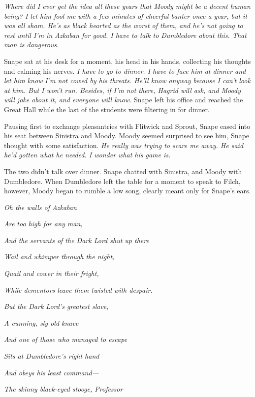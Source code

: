 \emph{Where did I ever get the idea all these years that Moody might be a decent human being? I let him fool me with a few minutes of cheerful banter once a year, but it was all sham. He's as black hearted as the worst of them, and he's not going to rest until I'm in Azkaban for good. I have to talk to Dumbledore about this. That man is dangerous.}

Snape sat at his desk for a moment, his head in his hands, collecting his thoughts and calming his nerves. \emph{I have to go to dinner. I have to face him at dinner and let him know I'm not cowed by his threats. He'll know anyway because I can't look at him. But I won't run. Besides, if I'm not there, Hagrid will ask, and Moody will joke about it, and everyone will know.} Snape left his office and reached the Great Hall while the last of the students were filtering in for dinner.

Pausing first to exchange pleasantries with Flitwick and Sprout, Snape eased into his seat between Sinistra and Moody. Moody seemed surprised to see him, Snape thought with some satisfaction. \emph{He really was trying to scare me away. He said he'd gotten what he needed. I wonder what his game is.}

The two didn't talk over dinner. Snape chatted with Sinistra, and Moody with Dumbledore. When Dumbledore left the table for a moment to speak to Filch, however, Moody began to rumble a low song, clearly meant only for Snape's ears.

\lbreak

\emph{Oh the walls of Azkaban}

\emph{Are too high for any man,}

\emph{And the servants of the Dark Lord shut up there}

\emph{Wail and whimper through the night,}

\emph{Quail and cower in their fright,}

\emph{While dementors leave them twisted with despair.}

\lbreak

\emph{But the Dark Lord's greatest slave,}

\emph{A cunning, sly old knave}

\emph{And one of those who managed to escape}

\emph{Sits at Dumbledore's right hand}

\emph{And obeys his least command—}

\emph{The skinny black-eyed stooge, Professor{\el}}

